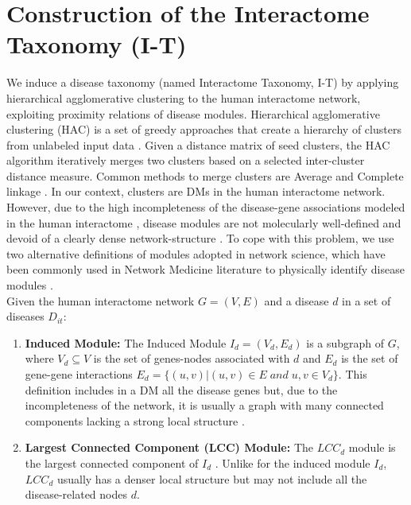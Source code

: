 \documentclass[journal,twoside,web]{ieeecolor}
\begin{document}
\section{Construction of the Interactome Taxonomy (I-T)}
\label{sec:induction of I-T}
We induce a disease   taxonomy (named Interactome Taxonomy, I-T)  by applying hierarchical agglomerative clustering  to the human interactome network, exploiting proximity relations of disease modules. 
Hierarchical agglomerative clustering (HAC) is a set of greedy approaches that create a  hierarchy of clusters from unlabeled input data \cite{murtagh2017algorithms}. 
Given a distance matrix of seed clusters, the HAC algorithm iteratively merges  two clusters based on a selected  inter-cluster distance measure. Common methods to merge clusters are Average and Complete linkage \cite{murtagh2017algorithms}.
In our context, clusters are DMs in the human interactome network.  
However, due to the  high incompleteness of the disease-gene associations modeled in the human interactome \cite{Venkatesan}, disease modules are not molecularly well-defined and devoid of a clearly dense network-structure \cite{menche2015uncovering}. To cope with this problem, we use two alternative definitions of modules adopted in network science, which have been   commonly used in Network Medicine literature to physically identify disease modules \cite{menche2015uncovering, agrawal2018large}.\\ 
Given the human interactome network $G=(V, E)$ and a disease $d$ in a set of diseases $D_{it}$:
\begin{enumerate}
    \item \textbf {Induced Module:} The Induced Module $I_{d} = (V_{d}, E_{d})$ is a subgraph of $G$, where  $V_{d} \subseteq V$ is  the set of genes-nodes associated with $d$ and  $E_{d}$ is the set of gene-gene interactions $E_{d}=\{(u, v)|(u, v) \in E\;and\;u, v \in V_{d}\}$\cite{menche2015uncovering}.  This  definition includes in a DM all the disease genes but, due to the incompleteness of the network, it is usually a  graph with many connected components lacking a strong local structure \cite{agrawal2018large}.
    
    \item \textbf {Largest Connected Component (LCC) Module:} The  $LCC_{d}$ module is the largest connected component of $I_{d}$ \cite{menche2015uncovering, agrawal2018large}.  Unlike for the induced module $I_{d}$, $LCC_{d}$ usually has a denser local structure but may not include all the disease-related nodes $d$.
    \end{enumerate}
 
\end{document}
